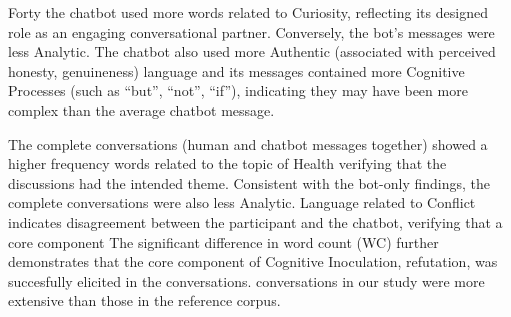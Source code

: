 \documentclass[sigconf]{acmart}
\begin{document}
Forty the chatbot used more words related to Curiosity, reflecting its designed role as an engaging conversational partner. Conversely, the bot's messages were less Analytic. The chatbot also used more Authentic (associated with perceived honesty, genuineness) language and its messages contained more Cognitive Processes (such as ``but'', ``not'', ``if''), indicating they may have been more complex than the average chatbot message. 

The complete conversations (human and chatbot messages together) showed a higher frequency words related to the topic of Health verifying that the discussions had the intended theme. Consistent with the bot-only findings, the complete conversations were also less Analytic. Language related to Conflict indicates disagreement between the participant and the chatbot, verifying that a core component The significant difference in word count (WC) further demonstrates that the core component of Cognitive Inoculation, refutation, was succesfully elicited in the conversations. conversations in our study were more extensive than those in the reference corpus.
\end{document}
